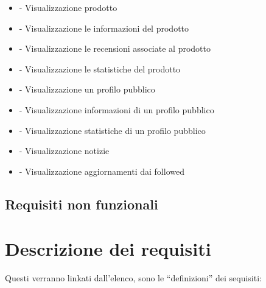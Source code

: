 \begin{itemize}
	\item {} - Visualizzazione prodotto
	\item {} - Visualizzazione le informazioni del prodotto
	\item {} - Visualizzazione le recensioni associate al prodotto
	\item {} - Visualizzazione le statistiche del prodotto

	\item {} - Visualizzazione un profilo pubblico
	\item {} - Visualizzazione informazioni di un profilo pubblico
	\item {} - Visualizzazione statistiche di un profilo pubblico

	\item {} - Visualizzazione notizie
	
	\item {} - Visualizzazione aggiornamenti dai followed
\end{itemize}	


\subsection{Requisiti non funzionali}
\label{sub:requisiti_non_funzionali}


\section{Descrizione dei requisiti}
\label{sec:descrizione_dei_requisiti}
Questi verranno linkati dall'elenco, sono le ``definizioni'' dei sequisiti:\\
 \\
 \\
 \\
 \\
 \\
\\
\\
\\
\\

